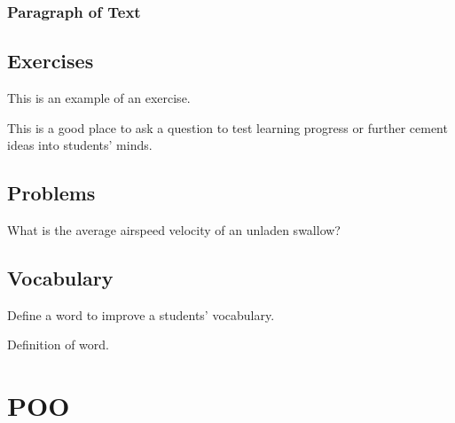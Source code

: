 \documentclass[11pt,fleqn]{book} %
\begin{document}
\subsection{Paragraph of Text}

\begin{example}
\lipsum[2]
\end{example}


\section{Exercises}

This is an example of an exercise.

\begin{exercise}
This is a good place to ask a question to test learning progress or further cement ideas into students' minds.
\end{exercise}


\section{Problems}

\begin{problem}
What is the average airspeed velocity of an unladen swallow?
\end{problem}


\section{Vocabulary}

Define a word to improve a students' vocabulary.

\begin{vocabulary}[Word]
Definition of word.
\end{vocabulary}


\chapter{POO}
\end{document}

